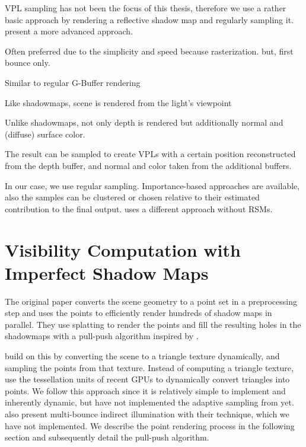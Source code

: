 VPL sampling has not been the focus of this thesis, therefore we use a rather basic approach by rendering a  reflective shadow map \parencite{Dachsbacher:2005:RSM} and regularly sampling it. \citet{hedman2016sequential} present a more advanced approach.

\begin{outline}
\1 Often preferred due to the simplicity and speed because rasterization. but, first bounce only.

\1 Similar to regular G-Buffer rendering

\1 Like shadowmaps, scene is rendered from the light's viewpoint

\1 Unlike shadowmaps, not only depth is rendered but additionally normal and (diffuse) surface color.

\1 The result can be sampled to create VPLs with a certain position reconstructed from the depth buffer, and normal and color taken from the additional buffers.

\1 In our case, we use regular sampling. Importance-based approaches are available, also the samples can be clustered \cite{} or chosen relative to their estimated contribution to the final output. \citet{hedman2016sequential} uses a different approach without RSMs.

\end{outline}

\section{Visibility Computation with Imperfect Shadow Maps}
\label{sec:ISM}


The original paper \citep{ritschel2008ism} converts the scene geometry to a point set in a preprocessing step and uses the points to efficiently render hundreds of shadow maps in parallel. They use splatting to render the points and fill the resulting holes in the shadowmaps with a pull-push algorithm inspired by \citep{Marroquim:2007:reconstruction}.

\citet{ritschel2011ismsViewAdaptive} build on \citet{laine2007incremental} this by converting the scene to a triangle texture dynamically, and sampling the points from that texture. Instead of computing a triangle texture, \citet{barak2013temporally} use the tessellation units of recent GPUs to dynamically convert triangles into points.
We follow this approach since it is relatively simple to implement and inherently dynamic, but have not implemented the adaptive sampling from \citet{ritschel2011ismsViewAdaptive} yet.
\citep{ritschel2008ism} also present multi-bounce indirect illumination with their technique, which we have not implemented.
We describe the point rendering process in the following section and subsequently detail the pull-push algorithm.

